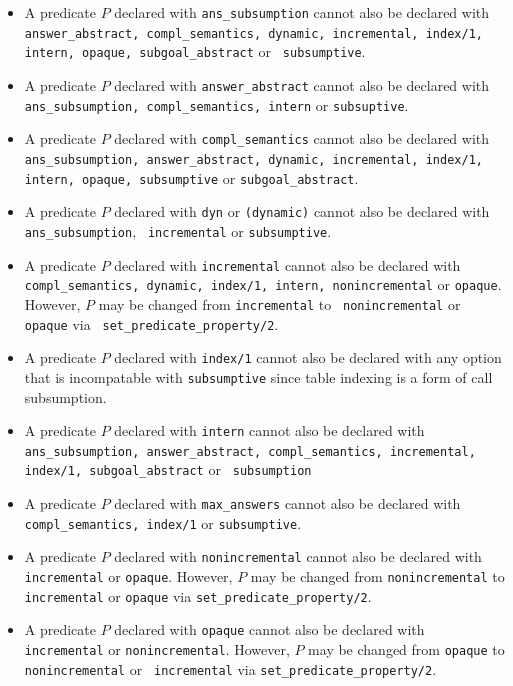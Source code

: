 \begin{itemize}
\item A predicate $P$ declared with {\tt ans\_subsumption} cannot also
  be declared with {\tt answer\_abstract, compl\_semantics, dynamic,
    incremental, index/1, intern, opaque, subgoal\_abstract} or {\tt
    subsumptive}.
%
\item A predicate $P$ declared with {\tt answer\_abstract} cannot also
  be declared with {\tt ans\_subsumption, compl\_semantics, intern} or
  {\tt subsuptive}.
%
\item A predicate $P$ declared with {\tt compl\_semantics} cannot also
  be declared with {\tt ans\_subsumption, answer\_abstract, dynamic,
    incremental, index/1, intern, opaque, subsumptive} or {\tt subgoal\_abstract}.
%
\item A predicate $P$ declared with {\tt dyn} or {\tt (dynamic)}
  cannot also be declared with {\tt ans\_subsumption}, {\tt
    incremental} or {\tt subsumptive}.
%
\item A predicate $P$ declared with {\tt incremental} cannot also be
  declared with {\tt compl\_semantics, dynamic, index/1, intern,
    nonincremental} or {\tt opaque}.
  However, $P$ may be changed from {\tt incremental} to {\tt
    nonincremental} or {\tt opaque} via {\tt
    set\_predicate\_property/2}.
%
\item A predicate $P$ declared with {\tt index/1} cannot also be
  declared with any option that is incompatable with {\tt subsumptive}
  since table indexing is a form of call subsumption.
%
\item A predicate $P$ declared with {\tt intern} cannot also be
  declared with {\tt ans\_subsumption, answer\_abstract,
    compl\_semantics, incremental, index/1, subgoal\_abstract} or {\tt
    subsumption}
%
\item A predicate $P$ declared with {\tt max\_answers} cannot also be
  declared with {\tt compl\_semantics, index/1} or {\tt subsumptive}.
%
\item A predicate $P$ declared with {\tt nonincremental} cannot also
  be declared with {\tt incremental} or {\tt opaque}.  However, $P$
  may be changed from {\tt nonincremental} to {\tt incremental} or
  {\tt opaque} via {\tt set\_predicate\_property/2}.
%
\item A predicate $P$ declared with {\tt opaque} cannot also be
  declared with {\tt incremental} or {\tt nonincremental}.  However,
  $P$ may be changed from {\tt opaque} to {\tt nonincremental} or {\tt
    incremental} via {\tt set\_predicate\_property/2}.

\end{itemize}
